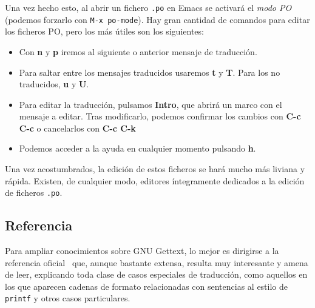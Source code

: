 Una vez hecho esto, al abrir un fichero \texttt{.po} en Emacs se activará el
\textit{modo PO} (podemos forzarlo con \texttt{M-x po-mode}). Hay gran cantidad
de comandos para editar los ficheros PO, pero los más útiles son los siguientes:

\begin{itemize}
\item Con \textbf{n} y \textbf{p} iremos al siguiente o anterior mensaje de
  traducción.
\item Para saltar entre los mensajes traducidos usaremos \textbf{t} y
  \textbf{T}. Para los no traducidos, \textbf{u} y \textbf{U}.
\item Para editar la traducción, pulsamos \textbf{Intro}, que abrirá un marco
  con el mensaje a editar. Tras modificarlo, podemos confirmar los cambios con
  \textbf{C-c C-c} o cancelarlos con \textbf{C-c C-k}
\item Podemos acceder a la ayuda en cualquier momento pulsando \textbf{h}.
\end{itemize}

Una vez acostumbrados, la edición de estos ficheros se hará mucho más liviana y
rápida. Existen, de cualquier modo, editores íntegramente dedicados a la edición
de ficheros \texttt{.po}.

\subsection{Referencia}
Para ampliar conocimientos sobre GNU Gettext, lo mejor es dirigirse a la
referencia oficial~\cite{refrefgettext} que, aunque bastante extensa, resulta
muy interesante y amena de leer, explicando toda clase de casos especiales de
traducción, como aquellos en los que aparecen cadenas de formato relacionadas
con sentencias al estilo de \texttt{printf} y otros casos particulares.

